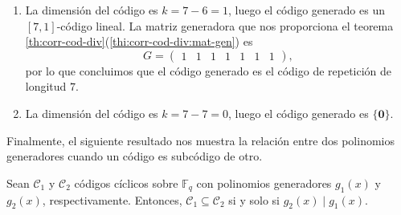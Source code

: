 \begin{example}
\begin{enumerate}
\[\begin{array}{rrrrrrr}
        0 & 0 & 1 & 1 & 1 & 0 & 1
        \end{array}\right).
    \]
    La matriz de paridad en este caso es \[
      H = \left(\begin{array}{rrrrrrr}
        1 & 0 & 1 & 1 & 0 & 0 & 0 \\
        0 & 1 & 0 & 1 & 1 & 0 & 0 \\
        0 & 0 & 1 & 0 & 1 & 1 & 0 \\
        0 & 0 & 0 & 1 & 0 & 1 & 1
        \end{array}\right)
    \]
    y por tanto el código generado es un \(\mathcal H_4\) código de Hamming.
    \item La dimensión del código es \(k = 7 - 6 = 1\), luego el código generado es un \([7, 1]\)-código lineal.
    La matriz generadora que nos proporciona el teorema \ref{th:corr-cod-div}(\ref{thi:corr-cod-div:mat-gen}) es \[
      G = \left(\begin{array}{rrrrrrr}
        1 & 1 & 1 & 1 & 1 & 1 & 1
        \end{array}\right),
    \] por lo que concluimos que el código generado es el código de repetición de longitud \(7\).
    \item La dimensión del código es \(k = 7 - 7 = 0\), luego el código generado es \(\{\mathbf 0\}\).
  \end{enumerate}
\end{example}

Finalmente, el siguiente resultado nos muestra la relación entre dos polinomios generadores cuando un código es subcódigo de otro.

\begin{corollary}
  \label{cor:subcodigos-ciclicos}
  Sean \(\mathcal C_1\) y \(\mathcal C_2\) códigos cíclicos sobre \(\mathbb F_q\) con polinomios generadores \(g_1(x)\) y \(g_2(x)\), respectivamente.
  Entonces, \(\mathcal C_1 \subseteq \mathcal C_2 \) si y solo si \(g_2(x) \mid g_1(x)\).
\end{corollary}

